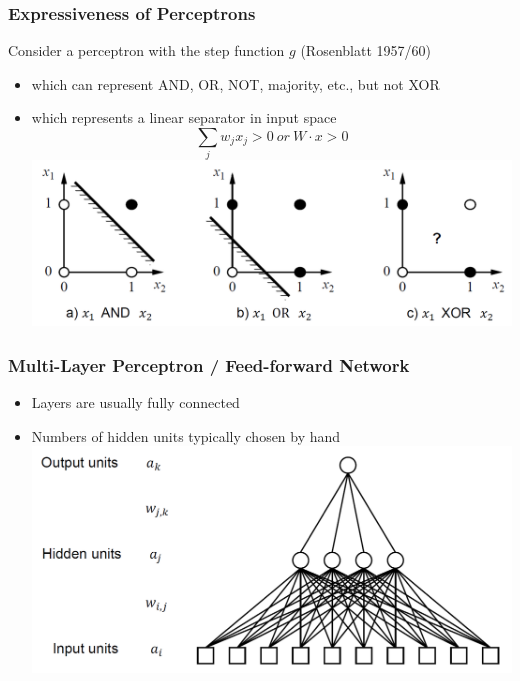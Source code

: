\documentclass[conference, a4paper]{styles/acmsiggraph}
\begin{document}
        \subsubsection{Expressiveness of Perceptrons}
            Consider a perceptron with the step function $g$ (Rosenblatt 1957/60)
            \begin{itemize}
                \item which can represent AND, OR, NOT, majority, etc., but not XOR
                \item which represents a linear separator in input space
                $$\sum\limits_{j} w_j x_j > 0 \ or\ W \cdot x > 0$$
                \includegraphics[width=1\textwidth]{imgs/ExpressivenessofPerceptrons.png}
            \end{itemize}
            
        \subsubsection{Multi-Layer Perceptron / Feed-forward Network}
            \begin{itemize}
                \item Layers are usually fully connected
                \item Numbers of hidden units typically chosen by hand\newline
                \includegraphics[width=1\textwidth]{imgs/MultiLayerPerceptron.png}
            \end{itemize}
\end{document}
